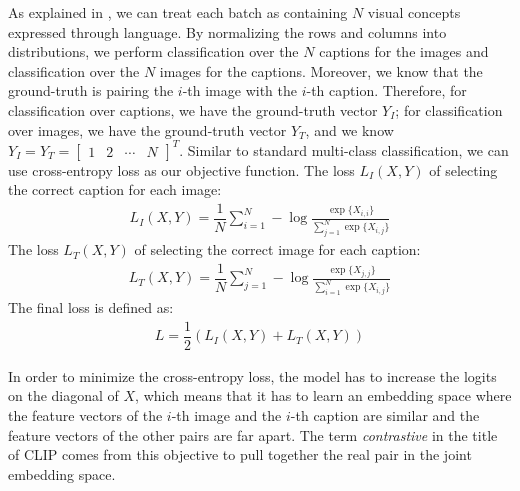 As explained in \cite{CLIPpaper}, we can treat each batch as containing $N$ visual concepts expressed through language.
By normalizing the rows and columns into distributions, we perform classification over the $N$ captions for the images and classification over the $N$ images for the captions.  
Moreover, we know that the ground-truth is pairing the $i$-th image with the $i$-th caption.   
Therefore, for classification over captions, we have the ground-truth vector $Y_I$; for classification over images, we have the ground-truth vector $Y_T$, and we know
$Y_I = Y_T = \begin{bmatrix}1 & 2 & \cdots & N \end{bmatrix}^T $.
Similar to standard multi-class classification, we can use cross-entropy loss as our objective function. The loss $L_I(X, Y)$ of selecting the correct caption for each image:
\begin{equation} \label{cliploss.image}
\begin{split}
    L_I(X, Y) = \dfrac{1}{N} \sum_{i=1}^N -\log\frac{\exp\{ {X}_{i,i} \}}{ \sum_{j=1}^N \exp\{ {X}_{i,j} \} }
\end{split}
\end{equation}
The loss $L_T(X, Y)$ of selecting the correct image for each caption:
\begin{equation} \label{cliploss.text}
\begin{split}
    L_T(X, Y) = \dfrac{1}{N} \sum_{j=1}^N -\log\frac{\exp\{ {X}_{j,j} \}}{ \sum_{i=1}^N \exp\{ {X}_{i,j} \} }
\end{split}
\end{equation}
The final loss is defined as:
\begin{equation} \label{cliploss.all}
\begin{split}
    L = \dfrac{1}{2} (L_I(X, Y) + L_T(X, Y))
\end{split}
\end{equation}

In order to minimize the cross-entropy loss, the model has to increase the logits on the diagonal of $X$, which means that it has to learn an embedding space where the feature vectors of the $i$-th image and the $i$-th caption are similar and the feature vectors of the other pairs are far apart. The term \textit{contrastive} in the title of CLIP comes from this objective to pull together the real pair in the joint embedding space.    


